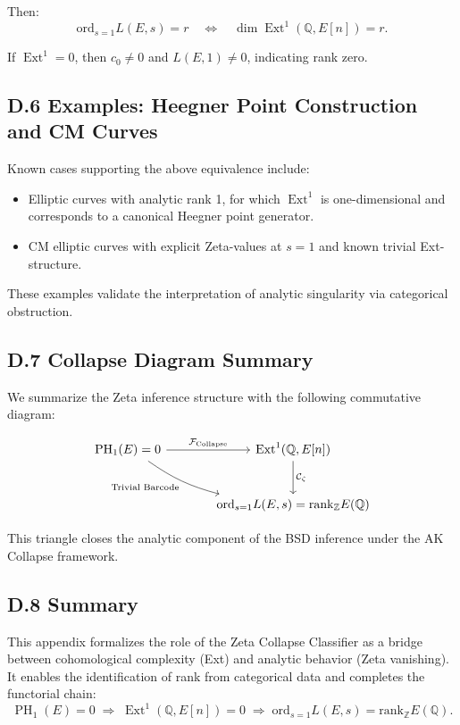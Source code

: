 \documentclass[11pt]{article}
\DeclareMathOperator{\Ext}{Ext}
\DeclareMathOperator{\PH}{PH}
\newcommand{\QQ}{\mathbb{Q}}
\newcommand{\ZZ}{\mathbb{Z}}
\begin{document}
Then:
\[
\mathrm{ord}_{s=1} L(E,s) = r \quad \Leftrightarrow \quad \dim \Ext^1(\QQ,E[n]) = r.
\]

If $\Ext^1 = 0$, then $c_0 \neq 0$ and $L(E,1) \neq 0$, indicating rank zero.

\subsection*{D.6 Examples: Heegner Point Construction and CM Curves}

Known cases supporting the above equivalence include:
\begin{itemize}
  \item Elliptic curves with analytic rank 1, for which $\Ext^1$ is one-dimensional and corresponds to a canonical Heegner point generator.
  \item CM elliptic curves with explicit Zeta-values at $s=1$ and known trivial Ext-structure.
\end{itemize}

These examples validate the interpretation of analytic singularity via categorical obstruction.

\subsection*{D.7 Collapse Diagram Summary}

We summarize the Zeta inference structure with the following commutative diagram:

\[
\begin{tikzcd}[row sep=large, column sep=large]
\PH_1(E) = 0 \arrow[r, "\mathcal{F}_{\mathrm{Collapse}}"] \arrow[dr, swap, bend right=10, "\text{Trivial Barcode}"]
& \Ext^1(\QQ,E[n]) \arrow[d, "\mathcal{C}_\zeta"] \\
& \mathrm{ord}_{s=1} L(E,s) = \mathrm{rank}_{\ZZ} E(\QQ)
\end{tikzcd}
\]

This triangle closes the analytic component of the BSD inference under the AK Collapse framework.

\subsection*{D.8 Summary}

This appendix formalizes the role of the Zeta Collapse Classifier as a bridge between cohomological complexity (Ext) and analytic behavior (Zeta vanishing).  
It enables the identification of rank from categorical data and completes the functorial chain:  
\[
\PH_1(E) = 0 \;\Rightarrow\; \Ext^1(\QQ,E[n]) = 0 \;\Rightarrow\; \mathrm{ord}_{s=1} L(E,s) = \mathrm{rank}_{\ZZ} E(\QQ).
\]
\end{document}
